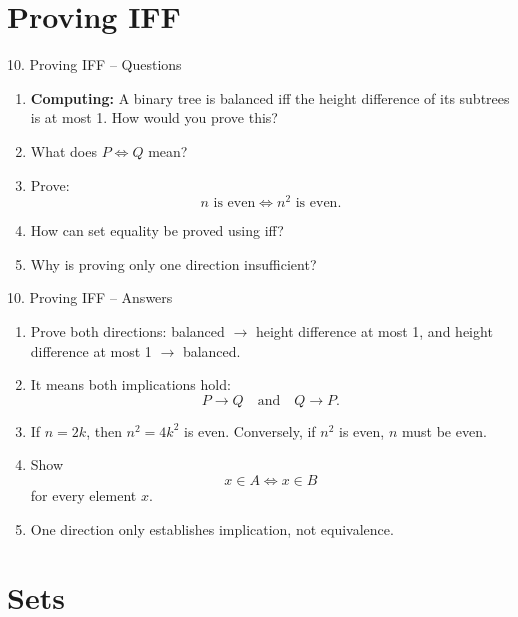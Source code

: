 \documentclass[aspectratio=169,11pt]{beamer}
\begin{document}
\section{Proving IFF}

\begin{frame}{10. Proving IFF -- Questions}

\begin{enumerate}
\item \textbf{Computing:} A binary tree is balanced iff the height difference of its subtrees is at most 1. How would you prove this?

\item What does $P\iff Q$ mean?

\item Prove:
\[
n\text{ is even}\iff n^2\text{ is even}.
\]

\item How can set equality be proved using iff?

\item Why is proving only one direction insufficient?
\end{enumerate}

\end{frame}

\begin{frame}{10. Proving IFF -- Answers}

\begin{enumerate}
\item Prove both directions: balanced $\to$ height difference at most 1, and height difference at most 1 $\to$ balanced.

\item It means both implications hold:
\[
P\to Q
\quad\text{and}\quad
Q\to P.
\]

\item If $n=2k$, then $n^2=4k^2$ is even. Conversely, if $n^2$ is even, $n$ must be even.

\item Show
\[
x\in A\iff x\in B
\]
for every element $x$.

\item One direction only establishes implication, not equivalence.
\end{enumerate}

\end{frame}


\section{Sets}
\end{document}
